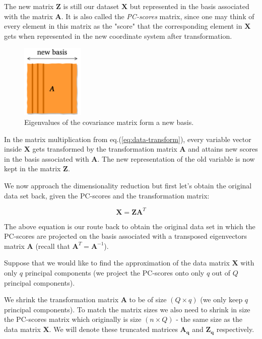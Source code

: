 \documentclass[10pt,twocolumn]{article}
\begin{document}
The new matrix $\bm{Z}$ is still our dataset $\bm{X}$ but represented in the basis associated with the matrix $\bm{A}$. It is also called the \textit{PC-scores} matrix, since one may think of every element in this matrix as the "score" that the corresponding element in $\bm{X}$ gets when represented in the new coordinate system after transformation.

\begin{figure}
\centering\includegraphics[width=3cm]{new-basis.png}
\caption{Eigenvalues of the covariance matrix form a new basis.}
\label{fig:new-basis}
\end{figure}


In the matrix multiplication from eq.(\ref{eq:data-transform}), every variable vector inside $\bm{X}$ gets transformed by the transformation matrix $\bm{A}$ and attains new scores in the basis associated with $\bm{A}$. The new representation of the old variable is now kept in the matrix $\bm{Z}$.

We now approach the dimensionality reduction but first let's obtain the original data set back, given the PC-scores and the transformation matrix:

\begin{equation}
\bm{X} = \bm{Z} \bm{A}^T
\end{equation}

The above equation is our route back to obtain the original data set in which the PC-scores are projected on the basis associated with a transposed eigenvectors matrix $\bm{A}$ (recall that $\bm{A}^T = \bm{A}^{-1}$).

Suppose that we would like to find the approximation of the data matrix $\bm{X}$ with only $q$ principal components (we project the PC-scores onto only $q$ out of $Q$ principal components).

We shrink the transformation matrix $\bm{A}$ to be of size $(Q \times q)$ (we only keep $q$ principal components). To match the matrix sizes we also need to shrink in size the PC-scores matrix which originally is size $(n \times Q)$ - the same size as the data matrix $\bm{X}$. We will denote these truncated matrices $\bm{A_q}$ and $\bm{Z_q}$ respectively.
\end{document}
